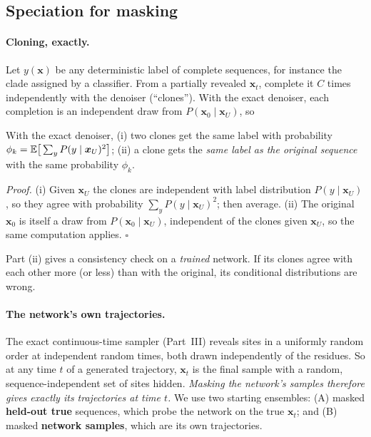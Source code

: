\subsection{Speciation for masking}\label{sec:dr_mask_spec}
\paragraph{Cloning, exactly.} Let $y(\bm x)$ be any deterministic label of complete sequences, for instance the clade
assigned by a classifier. From a partially revealed $\bm x_t$, complete it $C$ times independently with the denoiser
(``clones''). With the exact denoiser, each completion is an independent draw from $P(\bm x_0\mid\bm x_U)$, so
\begin{prop}\label{prop:clone}
With the exact denoiser, (i) two clones get the same label with probability
$\phi_k=\mathbb{E}\big[\sum_yP(y\mid\bm x_U)^2\big]$; (ii) a clone gets the \emph{same label as the original sequence} with the
same probability $\phi_k$.
\end{prop}
\emph{Proof.} (i) Given $\bm x_U$ the clones are independent with label distribution $P(y\mid\bm x_U)$, so they agree
with probability $\sum_yP(y\mid\bm x_U)^2$; then average. (ii) The original $\bm x_0$ is itself a draw from
$P(\bm x_0\mid\bm x_U)$, independent of the clones given $\bm x_U$, so the same computation applies. $\square$

Part (ii) gives a consistency check on a \emph{trained} network. If its clones agree with each other more (or less)
than with the original, its conditional distributions are wrong.

\paragraph{The network's own trajectories.} The exact continuous-time sampler (Part~III) reveals sites in a uniformly
random order at independent random times, both drawn independently of the residues. So at any time $t$ of a
generated trajectory, $\bm x_t$ is the final sample with a random, sequence-independent set of sites hidden.
\emph{Masking the network's samples therefore gives exactly its trajectories at time $t$.} We use two starting
ensembles: (A) masked \textbf{held-out true} sequences, which probe the network on the true $\bm x_t$; and (B) masked
\textbf{network samples}, which are its own trajectories.


